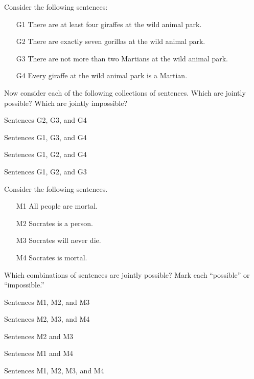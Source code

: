 \noindent \problempart Consider the following sentences: 
\begin{enumerate}%
\item[G1] \label{itm:at_least_four}There are at least four giraffes at the wild animal park.
\item[G2] \label{itm:exactly_seven} There are exactly seven gorillas at the wild animal park.
\item[G3] \label{itm:not_more_than_two} There are not more than two Martians at the wild animal park.
\item[G4] \label{itm:martians} Every giraffe at the wild animal park is a Martian.
\end{enumerate}

Now consider each of the following collections of sentences. Which are jointly possible? Which are jointly impossible?
\begin{earg}
\item Sentences G2, G3, and G4
\item Sentences G1, G3, and G4
\item Sentences G1, G2, and G4
\item Sentences G1, G2, and G3
\end{earg}

\problempart Consider the following sentences.
\begin{enumerate}%
\item[M1] \label{itm:allmortal} All people are mortal.
\item[M2] \label{itm:socperson} Socrates is a person.
\item[M3] \label{itm:socnotdie} Socrates will never die.
\item[M4] \label{itm:socmortal} Socrates is mortal.
\end{enumerate}
Which combinations of sentences are jointly possible? Mark each ``possible'' or ``impossible.''
\begin{earg}
\item Sentences M1, M2, and M3
\item Sentences M2, M3, and M4
\item Sentences M2 and M3
\item Sentences M1 and M4
\item Sentences M1, M2, M3, and M4
\end{earg}

